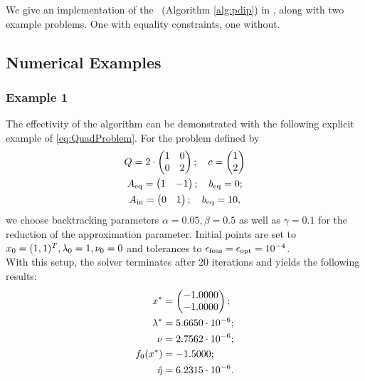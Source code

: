 We give an implementation of the \pdm \ (Algorithm \ref{alg:pdip}) in \matlab, along with two example problems. One with equality constraints, one without.

\subsection{Numerical Examples}
\subsubsection{Example 1}
The effectivity of the algorithm can be demonstrated with the following explicit example of \eqref{eq:QuadProblem}. For the problem defined by
\begin{gather*}
	Q = 2\cdot \begin{pmatrix}
	1 & 0\\ 0 & 2
\end{pmatrix}; \quad c = \begin{pmatrix} {1} \\ {2} \end{pmatrix}\\
{A}_{\mathrm{eq}}= \begin{pmatrix}
1 & -1
\end{pmatrix};\quad {b}_{\mathrm{eq}}= 0;\\
{A}_{\mathrm{{ in}}} = \begin{pmatrix}
0 & 1
\end{pmatrix}; \quad {b}_{\mathrm{eq}}= 10,
\end{gather*}
we choose backtracking parameters $ \alpha= 0.05,\beta = 0.5 $ as well as $ \gamma = 0.1 $ for the reduction of the approximation parameter. Initial points are set to $ x_0 = (1,1)^T, \lambda_0 = 1, \nu_0 = 0 $ and tolerances to $ {\epsilon}_{\mathrm{feas}} = {\epsilon}_{\mathrm{opt}} = 10^{-4} $.\\

With this setup, the solver terminates after 20 iterations and yields the following results:
\begin{align*}
	x^* &= \begin{pmatrix} {-1.0000} \\ {-1.0000} \end{pmatrix};\\
	\lambda^*&= 5.6650\cdot 10^{-6};\\ \nu&= 2.7562\cdot 10^{-6};\\
	f_0(x^*) &= -1.5000;\\ \hat{\eta}&= 6.2315\cdot 10^{-6}.
\end{align*}




